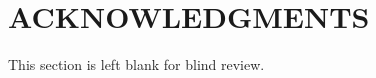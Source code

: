 \documentclass{article}
\begin{document}






\section{ACKNOWLEDGMENTS}
This section is left blank for blind review.


\end{document}
